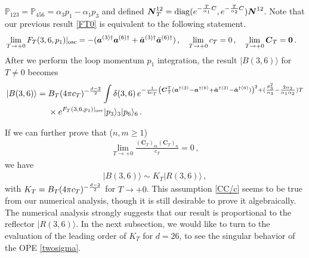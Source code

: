 \documentclass[12pt]{article}
\begin{document}
${\mathbb P}_{123}={\mathbb P}_{456}=\alpha_3p_1-\alpha_1p_3$ and
defined
$\boldsymbol{N}^{12}_T
={\rm diag}(e^{-{T\over\alpha_1}C},e^{-{T\over\alpha_2}C})
\boldsymbol{N}^{12}$.
Note that our previous result \eqref{FT0} is equivalent to the
following statement.
\begin{align}
&\lim_{T\to +0}F_{T}(3,6,p_1)|_{{\rm osc}}=
-(\boldsymbol{a}^{(3)\dagger}\boldsymbol{a}^{(6)\dagger}
+\bar{\boldsymbol{a}}^{(3)\dagger}
\bar{\boldsymbol{a}}^{(6)\dagger})\,,\quad
\lim_{T\to +0}c_{T}=0\,,\quad
\lim_{T\to +0}\boldsymbol{C}_{T}=\boldsymbol{0}\,.
\end{align}
After we perform the loop momentum $p_1$ integration, the result
$|B(3,6)\rangle$ for $T\ne 0$ becomes
\begin{align}
|B(3,6)\rangle
&=B_T(4\pi c_{T})^{-{d-2\over 2}}
\int\delta(3,6)\,e^{-\frac{1}{4c_T}\left(\boldsymbol{C}_T^{{\rm T}}
(\boldsymbol{a}^{\dagger(3)}-\boldsymbol{a}^{\dagger(6)}
+\bar{\boldsymbol{a}}^{\dagger(3)}-\bar{\boldsymbol{a}}^{\dagger(6)})
\right)^2+(\frac{p_3^2}{\alpha_3}-\frac{2\alpha_3}{\alpha_1\alpha_2})T}\nonumber\\
&~~~~\times
e^{F_{T}(3,6,p_1)|_{{\rm osc}}}
|p_3\rangle_3|p_6\rangle_6\,.
\end{align}

If we can further prove that ($n,m\ge 1$)
\begin{align}
\lim_{T\to +0}\frac{(\boldsymbol{C}_{T})_m(\boldsymbol{C}_{T})_n}
{c_T}=0\,,
\label{CC/c}
\end{align}
we have
\begin{align}
|B(3,6)\rangle\sim K_T|R(3,6)\rangle\,,
\label{propreflect}
\end{align}
with $K_T=B_T(4\pi c_{T})^{-{d-2\over 2}}$ for $T\to +0$.
This assumption \eqref{CC/c} seems to be true from our numerical
analysis, though it is still desirable to prove it algebraically.
The numerical analysis strongly suggests that our result is
proportional to the reflector $|R(3,6)\rangle$.
In the next subsection, we would like to turn to the evaluation of the
leading order of $K_T$ for $d=26$, to see the singular behavior of the
OPE \eqref{twosigma}.
\end{document}
